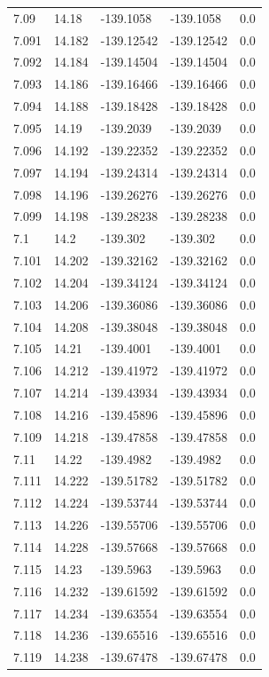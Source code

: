 \begin{tabular}{lllll}
7.09 & 14.18 & -139.1058 & -139.1058 & 0.0 \\
7.091 & 14.182 & -139.12542 & -139.12542 & 0.0 \\
7.092 & 14.184 & -139.14504 & -139.14504 & 0.0 \\
7.093 & 14.186 & -139.16466 & -139.16466 & 0.0 \\
7.094 & 14.188 & -139.18428 & -139.18428 & 0.0 \\
7.095 & 14.19 & -139.2039 & -139.2039 & 0.0 \\
7.096 & 14.192 & -139.22352 & -139.22352 & 0.0 \\
7.097 & 14.194 & -139.24314 & -139.24314 & 0.0 \\
7.098 & 14.196 & -139.26276 & -139.26276 & 0.0 \\
7.099 & 14.198 & -139.28238 & -139.28238 & 0.0 \\
7.1 & 14.2 & -139.302 & -139.302 & 0.0 \\
7.101 & 14.202 & -139.32162 & -139.32162 & 0.0 \\
7.102 & 14.204 & -139.34124 & -139.34124 & 0.0 \\
7.103 & 14.206 & -139.36086 & -139.36086 & 0.0 \\
7.104 & 14.208 & -139.38048 & -139.38048 & 0.0 \\
7.105 & 14.21 & -139.4001 & -139.4001 & 0.0 \\
7.106 & 14.212 & -139.41972 & -139.41972 & 0.0 \\
7.107 & 14.214 & -139.43934 & -139.43934 & 0.0 \\
7.108 & 14.216 & -139.45896 & -139.45896 & 0.0 \\
7.109 & 14.218 & -139.47858 & -139.47858 & 0.0 \\
7.11 & 14.22 & -139.4982 & -139.4982 & 0.0 \\
7.111 & 14.222 & -139.51782 & -139.51782 & 0.0 \\
7.112 & 14.224 & -139.53744 & -139.53744 & 0.0 \\
7.113 & 14.226 & -139.55706 & -139.55706 & 0.0 \\
7.114 & 14.228 & -139.57668 & -139.57668 & 0.0 \\
7.115 & 14.23 & -139.5963 & -139.5963 & 0.0 \\
7.116 & 14.232 & -139.61592 & -139.61592 & 0.0 \\
7.117 & 14.234 & -139.63554 & -139.63554 & 0.0 \\
7.118 & 14.236 & -139.65516 & -139.65516 & 0.0 \\
7.119 & 14.238 & -139.67478 & -139.67478 & 0.0 \\

\end{tabular}
